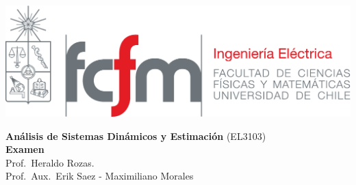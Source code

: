 \documentclass[
  11pt,
  letterpaper,
   addpoints,
  ]{exam}
\begin{document}
\noindent
\begin{minipage}{0.47\textwidth}
\includegraphics[width=\textwidth]{../fcfm_die}
\end{minipage}
\begin{minipage}{0.53\textwidth}
\begin{center} 
\large\textbf{Análisis de Sistemas Dinámicos y Estimación} (EL3103) \\
\large\textbf{Examen} \\
\normalsize Prof.~Heraldo Rozas.\\
\normalsize Prof.~Aux.~Erik Saez - Maximiliano Morales
\end{center}
\end{minipage}
\end{document}
